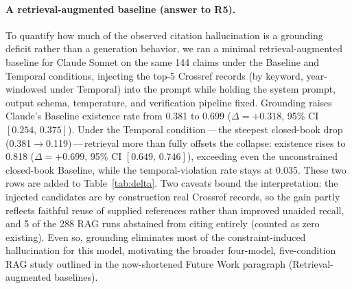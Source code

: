 \paragraph{A retrieval-augmented baseline (answer to R5).}
To quantify how much of the observed citation hallucination is a grounding deficit rather than a generation behavior, we ran a minimal retrieval-augmented baseline for Claude Sonnet on the same 144 claims under the Baseline and Temporal conditions, injecting the top-5 Crossref records (by keyword, year-windowed under Temporal) into the prompt while holding the system prompt, output schema, temperature, and verification pipeline fixed.
Grounding raises Claude's Baseline existence rate from 0.381 to 0.699 ($\Delta = +0.318$, 95\% CI $[0.254,\,0.375]$).
Under the Temporal condition\,---\,the steepest closed-book drop (0.381$\rightarrow$0.119)\,---\,retrieval more than fully offsets the collapse: existence rises to 0.818 ($\Delta = +0.699$, 95\% CI $[0.649,\,0.746]$), exceeding even the unconstrained closed-book Baseline, while the temporal-violation rate stays at 0.035.
These two rows are added to Table~\ref{tab:delta}. Two caveats bound the interpretation: the injected candidates are by construction real Crossref records, so the gain partly reflects faithful reuse of supplied references rather than improved unaided recall, and 5 of the 288 RAG runs abstained from citing entirely (counted as zero existing). Even so, grounding eliminates most of the constraint-induced hallucination for this model, motivating the broader four-model, five-condition RAG study outlined in the now-shortened Future Work paragraph (Retrieval-augmented baselines).
